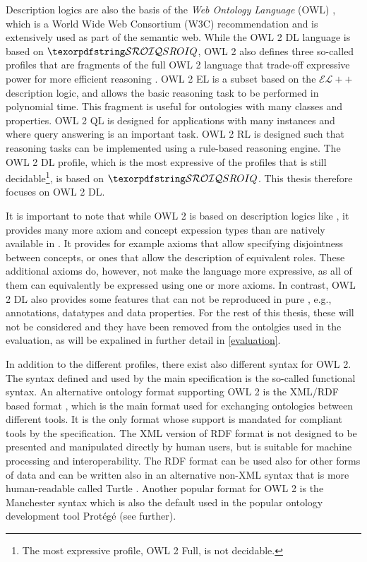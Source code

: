 
Description logics are also the basis of the \emph{Web Ontology Language} (OWL) \cite{hitzler2012primer,motik2012ontology}, which is a World Wide Web Consortium (W3C) recommendation and is extensively used as part of the semantic web. While the OWL 2 DL language is based on $\SROIQ$, OWL 2 also defines three so-called profiles that are fragments of the full OWL 2 language that trade-off expressive power for more efficient reasoning \cite{motik2012profiles,motik2012ontology}. OWL 2 EL is a subset based on the $\mathcal{EL}++$ description logic, and allows the basic reasoning task to be performed in polynomial time. This fragment is useful for ontologies with many classes and properties. OWL 2 QL is designed for applications with many instances and where query answering is an important task. OWL 2 RL is designed such that reasoning tasks can be implemented using a rule-based reasoning engine. The OWL 2 DL profile, which is the most expressive of the profiles that is still decidable\footnote{The most expressive profile, OWL 2 Full, is not decidable.}, is based on $\SROIQ$. This thesis therefore focuses on OWL 2 DL.

It is important to note that while OWL 2 is based on description logics like \SROIQ, it provides many more axiom and concept expession types than are natively available in \SROIQ. It provides for example axioms that allow specifying disjointness between concepts, or ones that allow the description of equivalent roles. These additional axioms do, however, not make the language more expressive, as all of them can equivalently be expressed using one or more \SROIQ axioms. In contrast, OWL 2 DL also provides some features that can not be reproduced in pure \SROIQ, e.g., annotations, datatypes and data properties. For the rest of this thesis, these will not be considered and they have been removed from the ontolgies used in the evaluation, as will be expalined in further detail in \cref{evaluation}.

In addition to the different profiles, there exist also different syntax for OWL 2. The syntax defined and used by the main specification \cite{motik2012ontology} is the so-called functional syntax. An alternative ontology format supporting OWL 2 is the XML/RDF based format \cite{beckett2004rdf,motik2009rdf}, which is the main format used for exchanging ontologies between different tools. It is the only format whose support is mandated for compliant tools by the specification. The XML version of RDF format is not designed to be presented and manipulated directly by human users, but is suitable for machine processing and interoperability. The RDF format can be used also for other forms of data and can be written also in an alternative non-XML syntax that is more human-readable called Turtle \cite{beckett2008turtle}. Another popular format for OWL 2 is the Manchester syntax \cite{horridge2009manchester} which is also the default used in the popular ontology development tool Protégé (see further).

